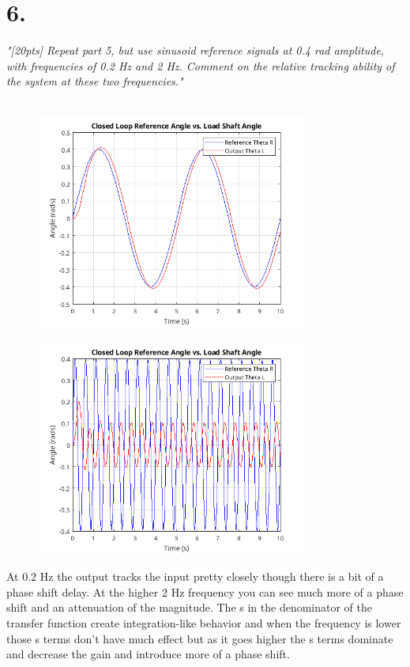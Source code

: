 \documentclass{article}
\begin{document}
\section*{6.}

\textit{
    "[20pts] Repeat part 5, but use sinusoid reference signals at 0.4 rad amplitude, with frequencies
    of 0.2 Hz and 2 Hz. Comment on the relative tracking ability of the system at these two
    frequencies."
}
\\
\\
\begin{figure}[H]
    \centering
    \includegraphics[width=0.8\textwidth]{closedSinePoint2Hz.png}
\end{figure}

\begin{figure}[H]
    \centering
    \includegraphics[width=0.8\textwidth]{closedSine2Hz.png}
\end{figure}

At 0.2 Hz the output tracks the input pretty closely though there is a bit of a phase shift delay.
At the higher 2 Hz frequency you can see much more of a phase shift and an attenuation of the magnitude.
The s in the denominator of the transfer function create integration-like behavior and when the frequency is lower those s terms don't have much effect but as it goes higher the s terms dominate and decrease the gain and introduce more of a phase shift.
\end{document}
